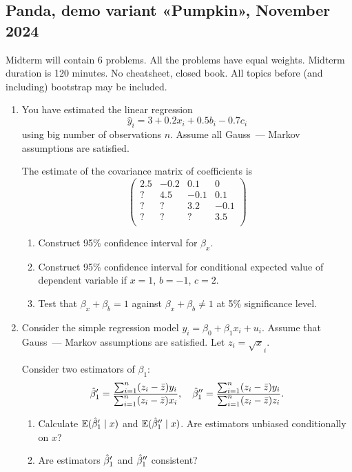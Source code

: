 \subsection{Panda, demo variant «Pumpkin», November 2024}

Midterm will contain 6 problems. 
All the problems have equal weights. 
Midterm duration is 120 minutes. 
No cheatsheet, closed book. 
All topics before (and including) bootstrap may be included. 

\begin{enumerate}
    \item You have estimated the linear regression 
    \[
    \hat y_i  = 3 + 0.2 x_i + 0.5 b_i - 0.7 c_i
    \]
    using big number of observations $n$. 
    Assume all Gauss~— Markov assumptions are satisfied. 

    The estimate of the covariance matrix of coefficients is 
    \[
    \begin{pmatrix}
        2.5 & -0.2 & 0.1  & 0 \\
        ?   &  4.5 & -0.1 & 0.1 \\
        ?   &   ?  & 3.2  & -0.1 \\
        ?   &   ?  &  ?   &  3.5 \\       
    \end{pmatrix}
    \]
    \begin{enumerate}
        \item Construct 95\% confidence interval for $\beta_x$.
        \item Construct 95\% confidence interval for conditional expected value of dependent variable if $x = 1$, $b = -1$, $c = 2$.
        \item Test that $\beta_x + \beta_b = 1$ against $\beta_ x + \beta_b \neq 1$ at 5\% significance level.
    \end{enumerate}


    \item Consider the simple regression model $y_i = \beta_0 + \beta_1 x_i + u_i$.
    Assume that Gauss~— Markov assumptions are satisfied.
    Let $z_i = \sqrt{x}_i$.

    Consider two estimators of $\beta_1$:
    \[
    \hat{\beta}_1' = \frac{\sum_{i=1}^n(z_i - \bar z)y_i}{\sum_{i=1}^n(z_i - \bar z)x_i}, \quad \hat{\beta}_1'' = \frac{\sum_{i=1}^n(z_i - \bar z)y_i}{\sum_{i=1}^n(z_i - \bar z)z_i}.
    \]
    \begin{enumerate}
        \item Calculate $\operatorname{\mathbb{E}}(\hat{\beta}_1' \mid x)$ and $\operatorname{\mathbb{E}}(\hat{\beta}_1'' \mid x)$. Are estimators unbiased conditionally on $x$?
        \item Are estimators $\hat{\beta}_1'$ and $\hat{\beta}_1''$ consistent?
    \end{enumerate}



\end{enumerate}
